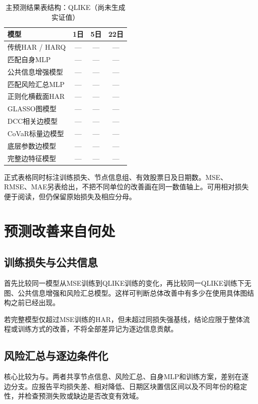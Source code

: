 \begin{table}[htbp]\centering\small
\caption{主预测结果表结构：QLIKE（尚未生成实证值）}\label{tab:main_results_pending}
\begin{tabularx}{\textwidth}{Yccc}
\toprule 模型 & 1日 & 5日 & 22日\\\midrule
传统HAR / HARQ & — & — & —\\
匹配自身MLP & — & — & —\\
公共信息增强模型 & — & — & —\\
匹配风险汇总MLP & — & — & —\\
正则化横截面HAR & — & — & —\\
GLASSO图模型 & — & — & —\\
DCC相关边模型 & — & — & —\\
CoVaR标量边模型 & — & — & —\\
底层参数边模型 & — & — & —\\
完整边特征模型 & — & — & —\\\bottomrule
\end{tabularx}
\end{table}

正式表格同时标注训练损失、节点信息组、有效股票日及日期数。MSE、RMSE、MAE另表给出，不把不同单位的改善画在同一数值轴上。可用相对损失便于阅读，但仍保留原始损失及相应分母。

\section{预测改善来自何处}
\subsection{训练损失与公共信息}
首先比较同一模型从MSE训练到QLIKE训练的变化，再比较同一QLIKE训练下无图、公共信息增强和风险汇总模型。这样可判断总体改善中有多少在使用具体图结构之前已经出现。


若完整模型仅超过MSE训练的HAR，但未超过同损失强基线，结论应限于整体流程或训练方式的改善，不将全部差异记为逐边信息贡献。

\subsection{风险汇总与逐边条件化}
核心比较为与。两者共享节点信息、风险汇总、自身MLP和训练方案，差别在逐边分支。应报告平均损失差、相对降低、日期区块置信区间以及不同年份的稳定性，并检查预测失败或缺边是否改变有效域。

